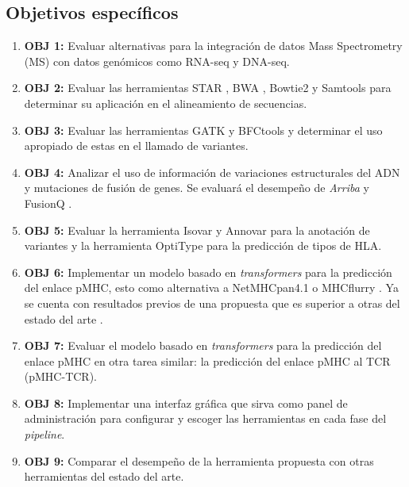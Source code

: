 \documentclass[a4paper,11pt]{article}
\begin{document}
	\subsection{Objetivos específicos}
	\begin{enumerate}
		\item \textbf{OBJ 1:} Evaluar alternativas para la integración de datos Mass Spectrometry (MS) con datos genómicos como RNA-seq y DNA-seq. 
		
		\item \textbf{OBJ 2:} Evaluar las herramientas STAR \cite{dobin2013star}, BWA \cite{li2009fast}, Bowtie2 \cite{langmead2019scaling} y Samtools \cite{danecek2021twelve} para determinar su aplicación en el alineamiento de secuencias.
		
		\item \textbf{OBJ 3:}
		Evaluar las herramientas GATK \cite{auwera2017somatic} y BFCtools \cite{danecek2021twelve} y determinar el uso apropiado de estas en el llamado de variantes. 
		
	
		
		\item \textbf{OBJ 4:} Analizar el uso de información de variaciones estructurales del ADN y mutaciones de fusión de genes. Se evaluará el desempeño de \textit{Arriba} \cite{uhrig2021accurate} y FusionQ \cite{liu2013fusionq}.


			\item \textbf{OBJ 5:} Evaluar la herramienta Isovar \cite{isovar2023} y Annovar \cite{wang2010annovar} para la anotación de variantes y la herramienta OptiType \cite{szolek2014optitype} para la predicción de tipos de HLA.
		 
		\item \textbf{OBJ 6:} Implementar un modelo basado en \textit{transformers} para la predicción del enlace pMHC, esto como alternativa a NetMHCpan4.1 \cite{reynisson2020netmhcpan} o MHCflurry \cite{o2020mhcflurry}. Ya se cuenta con resultados previos de una propuesta que es superior a otras del estado del arte \cite{arceda2023neoantigen}.

        \item \textbf{OBJ 7:} Evaluar el modelo basado en \textit{transformers} para la predicción del enlace pMHC en otra tarea similar: la predicción  del enlace pMHC al TCR (pMHC-TCR). 
        
        \item \textbf{OBJ 8:} Implementar una interfaz gráfica que sirva como panel de administración para configurar y escoger las herramientas en cada fase del \textit{pipeline}.
		
        \item \textbf{OBJ 9:} Comparar el desempeño de la herramienta propuesta con otras herramientas del estado del arte.

		
	\end{enumerate}
\end{document}
